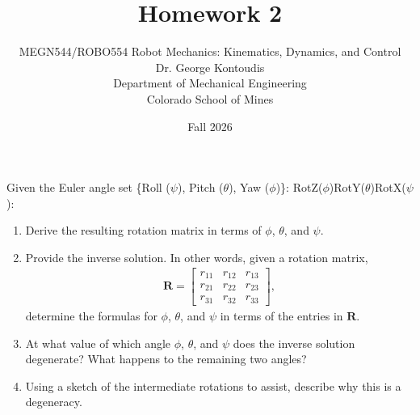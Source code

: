 \documentclass[12pt]{article}
\newenvironment{problem}[2][Problem]{\begin{trivlist}
\item[\hskip \labelsep {\bfseries #1}\hskip \labelsep {\bfseries #2.}]}{\end{trivlist}}
\begin{document}
 
 
\title{Homework 2}
\author{MEGN544/ROBO554 Robot Mechanics: Kinematics, Dynamics, and Control  
\\ 
Dr. George Kontoudis\\
Department of Mechanical Engineering\\
Colorado School of Mines}
\date{Fall 2026}
 
\maketitle
\begin{problem}{1}%
Given the Euler angle set \{Roll ($\psi$), Pitch ($\theta$), Yaw ($\phi$)\}: RotZ($\phi$)RotY($\theta$)RotX($\psi$):
\begin{enumerate}[label=(\alph*)]
    \item Derive the resulting rotation matrix in terms of $\phi$, $\theta$, and $\psi$.
    \item Provide the inverse solution. In other words, given a rotation matrix,
    \begin{align*}
        \boldsymbol{R} = \begin{bmatrix}
        r_{11} & r_{12} & r_{13} \\
        r_{21} & r_{22} & r_{23} \\
        r_{31} & r_{32} & r_{33}
        \end{bmatrix},
    \end{align*}
        determine the formulas for $\phi$, $\theta$, and $\psi$ in terms of the entries in $\boldsymbol{R}$.
    \item At what value of which angle $\phi$, $\theta$, and $\psi$ does the inverse solution degenerate? What happens to the remaining two angles?
    \item Using a sketch of the intermediate rotations to assist, describe why this is a degeneracy.
\end{enumerate}
 
\end{problem}
\end{document}
